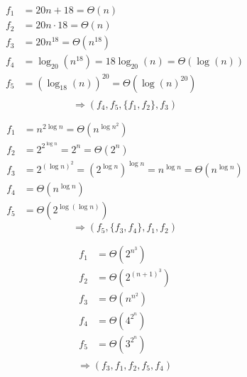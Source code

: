 \documentclass[12pt,twoside]{article}
\begin{document}


\begin{problems}

\problem  %

\begin{problemparts}
\problempart %

\begin{align*}
        f_1 &= 20n+18 = \Theta(n) \\
        f_2 &= 20n\cdot18 = \Theta(n) \\
   		f_3 &= 20n^{18} = \Theta(n^{18}) \\
        f_4 &= \log_{20}(n^{18}) = 18\log_{20}(n) = \Theta(\log(n)) \\
        f_5 &= (\log_{18}(n))^{20} = \Theta(\log(n)^{20}) \\                           
\end{align*}
$$ \Rightarrow (f_4, f_5, \{f_1, f_2\}, f_3)$$

\problempart %

\begin{align*}
	f_1 &= n^{2\log n} = \Theta(n^{\log n^2})\\
	f_2 &= 2^{2^{\log n}} = 2^n = \Theta(2^n) \\
	f_3 &= 2^{(\log n)^2} = (2^{\log n})^{\log n}= n^{\log n} =  \Theta(n^{\log n}) \\
	f_4 &= \Theta(n^{\log n}) \\
	f_5 &= \Theta(2^{\log (\log n)})
\end{align*}
$$ \Rightarrow (f_5, \{ f_3, f_4\}, f_1, f_2)$$

\problempart %

\begin{align*}
f_1 &= \Theta(2^{n^3}) \\
f_2 &= \Theta(2^{(n+1)^3}) \\
f_3 &= \Theta(n^{n^2}) \\
f_4 &= \Theta(4^{2^n}) \\
f_5 &= \Theta(3^{2^n}) \\
\end{align*}
$$ \Rightarrow (f_3,f_1,f_2, f_5, f_4)$$


\end{problemparts}
\end{problems}
\end{document}
